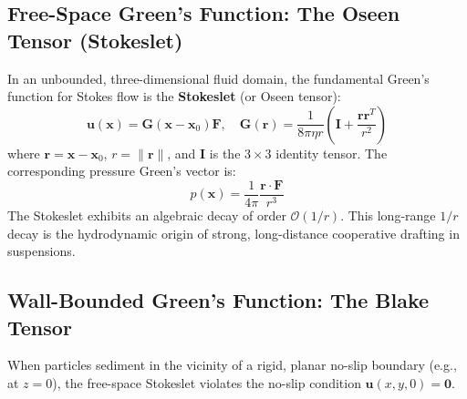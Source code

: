 \documentclass[11pt,a4paper]{article}
\begin{document}
\subsection{Free-Space Green's Function: The Oseen Tensor (Stokeslet)}
In an unbounded, three-dimensional fluid domain, the fundamental Green's function for Stokes flow is the \textbf{Stokeslet} (or Oseen tensor):
\begin{equation}
    \mathbf{u}(\mathbf{x}) = \mathbf{G}(\mathbf{x} - \mathbf{x}_0) \mathbf{F}, \quad \mathbf{G}(\mathbf{r}) = \frac{1}{8\pi\eta r} \left( \mathbf{I} + \frac{\mathbf{r}\mathbf{r}^T}{r^2} \right) \label{eq:oseen_tensor}
\end{equation}
where $\mathbf{r} = \mathbf{x} - \mathbf{x}_0$, $r = \|\mathbf{r}\|$, and $\mathbf{I}$ is the $3 \times 3$ identity tensor. The corresponding pressure Green's vector is:
\begin{equation}
    p(\mathbf{x}) = \frac{1}{4\pi} \frac{\mathbf{r} \cdot \mathbf{F}}{r^3}
\end{equation}
The Stokeslet exhibits an algebraic decay of order $\mathcal{O}(1/r)$. This long-range $1/r$ decay is the hydrodynamic origin of strong, long-distance cooperative drafting in suspensions.

\subsection{Wall-Bounded Green's Function: The Blake Tensor}
When particles sediment in the vicinity of a rigid, planar no-slip boundary (e.g., at $z = 0$), the free-space Stokeslet violates the no-slip condition $\mathbf{u}(x, y, 0) = \mathbf{0}$. 
\end{document}
